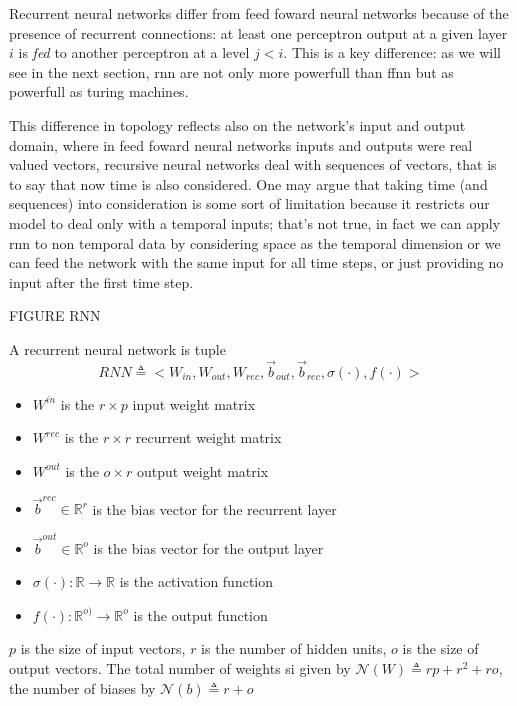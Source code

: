 Recurrent neural networks differ from feed foward neural networks because of the presence of recurrent connections: at least one perceptron output at a given layer $i$ is \textit{fed} to another perceptron
at a level $j<i$. This is a key difference: as we will see in the next section, rnn are not only more powerfull than ffnn but as powerfull as turing machines.


This difference in topology reflects also on the network's input and output domain, where in feed foward neural networks inputs and outputs were real valued vectors, recursive neural networks deal with
sequences of vectors, that is to say that now time is also considered. One may argue that taking time (and sequences) into consideration is some sort of limitation because it restricts our model to deal only
with a temporal inputs; that's not true, in fact we can apply rnn to non temporal data by considering space as the temporal dimension or we can feed the network with the same input for all time steps, or just
providing no input after the first time step.

FIGURE RNN


\begin{defn}
\label{def_rnn}
A recurrent  neural network is tuple
$$RNN\triangleq< W_{in}, W_{out}, W_{rec},\vec{b}_{out}, \vec{b}_{rec} ,\sigma(\cdot),f(\cdot)>$$
\begin{itemize}
 \item $W^{in}$ is the $r\times p$ input weight matrix
 \item $W^{rec}$ is the $r\times r$ recurrent weight matrix
 \item $W^{out}$ is the $o \times r$ output weight matrix
 \item $\vec{b}^{rec} \in \mathbb{R}^{r}$ is the bias vector for the recurrent layer
 \item $\vec{b}^{out} \in \mathbb{R}^{o}$ is the bias vector for the output layer
 \item $\sigma(\cdot): \mathbb{R}\rightarrow \mathbb{R}$ is the activation function
 \item $f(\cdot): \mathbb{R}^{o)}\rightarrow \mathbb{R}^{o}$ is the output function
\end{itemize}
$p$ is the size of input vectors, $r$ is the number of hidden units, $o$ is the size of output vectors. 
The total number of weights si given by $\mathcal{N}(W) \triangleq rp+r^2+ro$, the number of biases by $\mathcal{N}(b) \triangleq r+o $
\end{defn}

